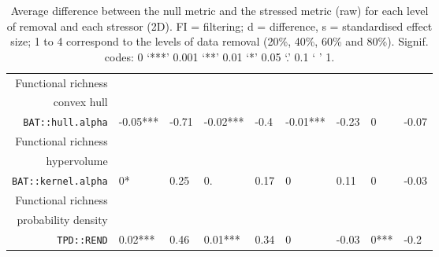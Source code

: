 \begin{table}[ht]
\begin{tabular}{rllllllll}
  Functional richness\\convex hull\\\texttt{BAT::hull.alpha} & -0.05*** & -0.71 & -0.02*** & -0.4 & -0.01*** & -0.23 & 0 & -0.07 \\ 
  Functional richness\\hypervolume\\\texttt{BAT::kernel.alpha} & 0* & 0.25 & 0. & 0.17 & 0 & 0.11 & 0 & -0.03 \\ 
  Functional richness\\probability density\\\texttt{TPD::REND} & 0.02*** & 0.46 & 0.01*** & 0.34 & 0 & -0.03 & 0*** & -0.2 \\ 
   \hline
\end{tabular}
\caption{Average difference between the null metric and the stressed metric (raw) for each level of removal and each stressor (2D). FI = filtering; d = difference, s = standardised effect size; 1 to 4 correspond to the levels of data removal (20\%, 40\%, 60\% and 80\%). Signif. codes:  0 ‘***’ 0.001 ‘**’ 0.01 ‘*’ 0.05 ‘.’ 0.1 ‘ ’ 1.} 
\end{table}
